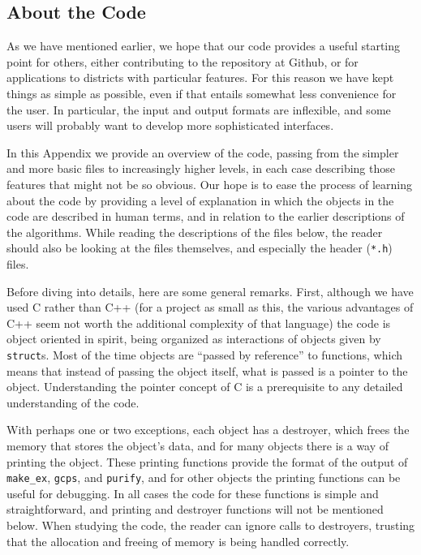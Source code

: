 \documentclass[12pt]{article}
\theoremstyle{definition}
\begin{document}
\begin{appendix}

\section{About the Code} \label{app:Code}

As we have mentioned earlier, we hope that our code provides a useful
starting point for others, either contributing to the repository at
Github, or for applications to districts with particular features.
For this reason we have kept things as simple as possible, even if
that entails somewhat less convenience for the user.  In particular,
the input and output formats are inflexible, and some users will
probably want to develop more sophisticated interfaces.

In this Appendix we provide an overview of the code, passing from the
simpler and more basic files to increasingly higher levels, in each
case describing those features that might not be so obvious.  Our hope
is to ease the process of learning about the code by providing a level
of explanation in which the objects in the code are described in human
terms, and in relation to the earlier descriptions of the algorithms.
While reading the descriptions of the files below, the reader should
also be looking at the files themselves, and especially the header
(\texttt{*.h}) files.

Before diving into details, here are some general remarks.  First,
although we have used C rather than C++ (for a project as small as
this, the various advantages of C++ seem not worth the additional
complexity of that language) the code is object oriented in spirit,
being organized as interactions of objects given by \texttt{struct}s.
Most of the time objects are ``passed by reference'' to functions,
which means that instead of passing the object itself, what is passed
is a pointer to the object.  Understanding the pointer concept of C is
a prerequisite to any detailed understanding of the code.

With perhaps one or two exceptions, each object has a destroyer, which
frees the memory that stores the object's data, and for many objects
there is a way of printing the object.  These printing functions
provide the format of the output of \texttt{make\_ex}, \texttt{gcps},
and \texttt{purify}, and for other objects the printing functions can
be useful for debugging.  In all cases the code for these functions is
simple and straightforward, and printing and destroyer functions will
not be mentioned below.  When studying the code, the reader can ignore
calls to destroyers, trusting that the allocation and freeing of
memory is being handled correctly.


\end{appendix}
\end{document}
